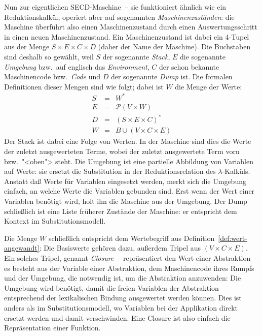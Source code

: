 Nun zur eigentlichen SECD-Maschine~-- sie funktioniert ähnlich wie ein
Reduktionskalkül, operiert aber auf sogenannten
\textit{Maschinenzuständen}: die Maschine überführt also einen
Maschinenzustand durch einen Auswertungsschritt in einen neuen
Maschinenzustand.  Ein Maschinenzustand ist dabei ein 4-Tupel aus der
Menge $S\times E\times C\times D$ (daher der Name der Maschine).  Die
Buchstaben sind deshalb so gewählt, weil $S$ der sogenannte
\textit{Stack}, $E$ die sogenannte
\textit{Umgebung} bzw.\ auf englisch das
\textit{Environment}, $C$ der schon bekannte
Maschinencode bzw.\ \textit{Code} und $D$ der
sogenannte \textit{Dump} ist.  Die formalen Definitionen
dieser Mengen sind wie folgt; dabei ist $W$ die Menge der Werte:
%
\begin{eqnarray*}
  S &=& W^\ast\\
  E &=& \mathcal{P}(V\times W)\\
  D &=& (S\times E \times C)^\ast\\
  W &=& B \cup (V\times C\times E)
\end{eqnarray*}
%
Der Stack ist dabei eine Folge von Werten.  In der Maschine sind dies
die Werte der zuletzt ausgewerteten Terme, wobei der zuletzt
ausgewertete Term vorn bzw.\ "<oben"> steht.  Die Umgebung ist eine
partielle Abbildung von Variablen auf Werte: sie ersetzt die
Substitution in der Reduktionsrelation des $\lambda$-Kalküls.  Anstatt
daß Werte für Variablen eingesetzt werden, merkt sich die Umgebung
einfach, an welche Werte die Variablen gebunden sind.  Erst wenn der
Wert einer Variablen benötigt wird, holt ihn die Maschine aus der
Umgebung.  Der Dump schließlich ist eine Liste früherer Zustände der
Maschine: er entspricht dem Kontext im
Substitutionsmodell.

Die Menge $W$ schließlich entspricht dem Wertebegriff aus
Definition~\ref{def:wert-angewandt}: Die Basiswerte gehören dazu,
außerdem Tripel aus $(V\times C\times E)$.  Ein solches Tripel,
genannt \textit{Closure}~-- repräsentiert den Wert
einer Abstraktion~-- es besteht aus der Variable einer Abstraktion,
dem Maschinencode ihres Rumpfs und der Umgebung, die notwendig ist, um
die Abstraktion anzuwenden: Die Umgebung wird benötigt, damit die
freien Variablen der Abstraktion entsprechend der lexikalischen
Bindung ausgewertet werden können.  Dies
ist anders als im Substitutionsmodell, wo Variablen bei der
Applikation direkt ersetzt werden und damit verschwinden.  Eine
Closure ist also einfach die Repräsentation einer Funktion.

